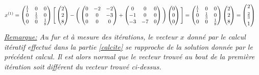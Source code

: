 \begin{align*}
x^{(1)}&=\begin{pmatrix}
  \frac{1}{1}&0&0\\
  0&\frac{1}{3}&0\\
  0&0&\frac{1}{8}\\
\end{pmatrix}\Bigg[\begin{pmatrix}
  2 \\
  2 \\
  8 \\
\end{pmatrix}-\Bigg(\begin{pmatrix}
  0&-2&-2\\
  0&0&-3\\
  0&0&0\\
\end{pmatrix}+\begin{pmatrix}
  0&0&0\\
  -1&0&0\\
  -3&-7&0\\
\end{pmatrix}\Bigg)\begin{pmatrix}
  0 \\
  0 \\
  0 \\
\end{pmatrix}\Bigg]
=\begin{pmatrix}
  \frac{1}{1}&0&0\\
  0&\frac{1}{3}&0\\
  0&0&\frac{1}{8}\\
\end{pmatrix}\begin{pmatrix}
  2 \\
  2 \\
  8 \\
\end{pmatrix}
=\begin{pmatrix}
  2 \vspace{4pt}\\
  \frac{2}{3} \vspace{4pt}\\
  1 \\
\end{pmatrix}
\end{align*}
\textit{\underline{Remarque:} Au fur et à mesure des itérations, le vecteur $x$ donné par le calcul itératif effectué dans la partie \ref{calcite} se rapproche de la solution donnée par le précédent calcul. Il est alors normal que le vecteur trouvé au bout de la première itération soit différent du vecteur trouvé ci-dessus.}

